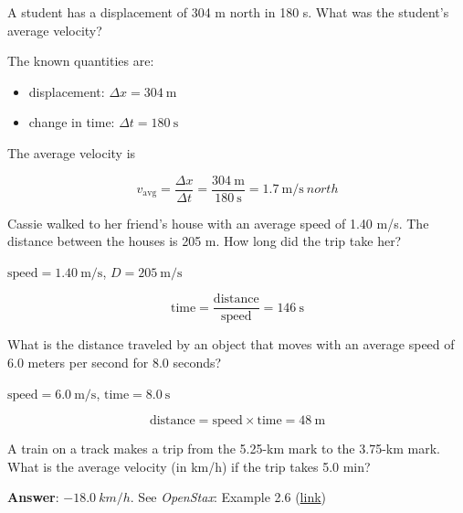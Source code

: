 \documentclass[]{exam}
\begin{document}
\begin{questions}
\begin{questions}
\question
A student has a displacement of 304 m north in 180 s. What was the student's average velocity?

\begin{solution}
The known quantities are:

\begin{itemize}
    \item displacement: $\Delta{x} = \SI{304}{\meter}$
    \item change in time: $\Delta{t} = \SI{180}{\second}$
\end{itemize}

The average velocity is

\begin{equation*}
    v_{\mathrm{avg}} = \frac{\Delta{x}}{\Delta{t}} = \frac{\SI{304}{\meter}}{\SI{180}{\second}} = \SI[per-mode=symbol]{1.7}{\meter\per\second\ north}
\end{equation*}
\end{solution}



\question
Cassie walked to her friend’s house with an average speed of 1.40 m/s. The distance between the houses is 205 m. How long did the trip take her?

\begin{solution}
    $\text{speed} = \SI{1.40}{\meter/\second}$, $D = \SI{205}{\meter/\second}$

\begin{equation*}
    \text{time} = \frac{\text{distance}}{\text{speed}} = \SI{146}{\second}
\end{equation*}
\end{solution}

\question
What is the distance traveled by an object that moves with an average speed of 6.0 meters per second for 8.0 seconds?

\begin{solution}
    $\text{speed} = \SI{6.0}{\meter/\second}$, $\text{time} = \SI{8.0}{\second}$

\begin{equation*}
    \text{distance} = \text{speed} \times \text{time} = \SI{48}{\meter} 
\end{equation*}
\end{solution}


\question
A train on a track makes a trip from the 5.25-km mark to the 3.75-km mark. What is the average velocity (in km/h) if the trip takes 5.0 min?

\begin{solution}
    \textbf{Answer}: $\SI{-18.0}{km/h}$. See \textit{OpenStax}: Example 2.6 (\href{https://openstax.org/books/college-physics/pages/2-4-acceleration}{link})
\end{solution}


\end{questions}
\end{questions}
\end{document}
